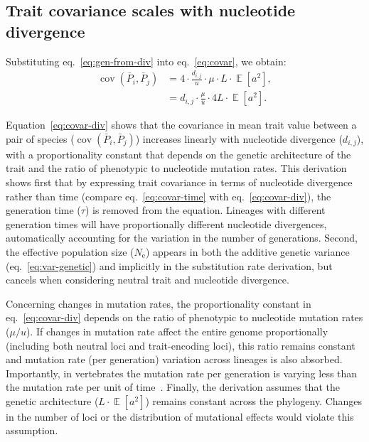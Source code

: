 \documentclass{article}
\newcommand{\Multiply}{\cdot}
\DeclareMathOperator{\E}{\mathbb{E}}
\DeclareMathOperator{\Cov}{\text{cov}}
\newcommand{\Ne}{N_{\text{e}}}
\newcommand{\Trait}{P}
\newcommand{\MutationRatePheno}{\mu}
\newcommand{\MutationRateNuc}{u}
\newcommand{\NbrLoci}{L}
\newcommand{\Spi}{i}
\newcommand{\Spj}{j}
\newcommand{\GenerationTime}{\tau}
\newcommand{\NucDiv}{d_{\Spi, \Spj}}
\newcommand{\MeanTrait}{\bar{\Trait}}
\newcommand{\VarPhy}{\Cov \left( \MeanTrait_{\Spi}, \MeanTrait_{\Spj}\right)}
\newcommand{\GenArchi}{\NbrLoci \Multiply \E \left[ a^2 \right]}
\begin{document}
\subsection{Trait covariance scales with nucleotide divergence}

Substituting eq.~\ref{eq:gen-from-div} into eq.~\ref{eq:covar}, we obtain:
\begin{align}
    \VarPhy & = 4 \Multiply \frac{\NucDiv}{\MutationRateNuc} \Multiply \MutationRatePheno \Multiply \GenArchi, \\
    & = \NucDiv \Multiply \frac{\MutationRatePheno}{\MutationRateNuc} \Multiply 4\GenArchi . \label{eq:covar-div}
\end{align}

Equation~\ref{eq:covar-div} shows that the covariance in mean trait value between a pair of species ($\VarPhy$) increases linearly with nucleotide divergence ($\NucDiv$), with a proportionality constant that depends on the genetic architecture of the trait and the ratio of phenotypic to nucleotide mutation rates.
This derivation shows first that by expressing trait covariance in terms of nucleotide divergence rather than time (compare eq.~\ref{eq:covar-time} with eq.~\ref{eq:covar-div}), the generation time ($\GenerationTime$) is removed from the equation.
Lineages with different generation times will have proportionally different nucleotide divergences, automatically accounting for the variation in the number of generations.
Second, the effective population size ($\Ne$) appears in both the additive genetic variance (eq.~\ref{eq:var-genetic}) and implicitly in the substitution rate derivation, but cancels when considering neutral trait and nucleotide divergence.

Concerning changes in mutation rates, the proportionality constant in eq.~\ref{eq:covar-div} depends on the ratio of phenotypic to nucleotide mutation rates ($\MutationRatePheno / \MutationRateNuc$).
If changes in mutation rate affect the entire genome proportionally (including both neutral loci and trait-encoding loci), this ratio remains constant and mutation rate (per generation) variation across lineages is also absorbed.
Importantly, in vertebrates the mutation rate per generation is varying less than the mutation rate per unit of time~\citep{bergeron_evolution_2023}.
Finally, the derivation assumes that the genetic architecture ($\GenArchi$) remains constant across the phylogeny.
Changes in the number of loci or the distribution of mutational effects would violate this assumption.
\end{document}

